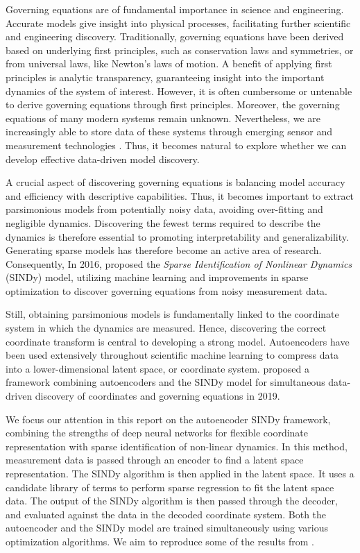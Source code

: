 Governing equations are of fundamental importance in science and engineering. 
Accurate models give insight into physical processes, facilitating further scientific and engineering discovery. 
Traditionally, governing equations have been derived based on underlying first principles, such as conservation laws and symmetries, or from universal laws, like Newton's laws of motion. 
A benefit of applying first principles is analytic transparency, guaranteeing insight into the important dynamics of the system of interest. 
However, it is often cumbersome or untenable to derive governing equations through first principles. 
Moreover, the governing equations of many modern systems remain unknown. 
Nevertheless, we are increasingly able to store data of these systems through emerging sensor and measurement technologies \cite{Champion_2019}. 
Thus, it becomes natural to explore whether we can develop effective data-driven model discovery. 

A crucial aspect of discovering governing equations is balancing model accuracy and efficiency with descriptive capabilities. 
Thus, it becomes important to extract parsimonious models from potentially noisy data, avoiding over-fitting and negligible dynamics. 
Discovering the fewest terms required to describe the dynamics is therefore essential to promoting interpretability and generalizability. 
Generating sparse models has therefore become an active area of research. 
Consequently, In 2016, \textcite{Brunton_2016} proposed the \textit{Sparse Identification of Nonlinear Dynamics} (SINDy) model, utilizing machine learning and improvements in sparse optimization to discover governing equations from noisy measurement data. 

Still, obtaining parsimonious models is fundamentally linked to the coordinate system in which the dynamics are measured. 
Hence, discovering the correct coordinate transform is central to developing a strong model. 
Autoencoders have been used extensively throughout scientific machine learning to compress data into a lower-dimensional latent space, or coordinate system. \textcite{Champion_2019} proposed a framework combining autoencoders and the SINDy model for simultaneous data-driven discovery of coordinates and governing equations in 2019.

We focus our attention in this report on the autoencoder SINDy framework, combining the strengths of deep neural networks for flexible coordinate representation with sparse identification of non-linear dynamics. 
In this method, measurement data is passed through an encoder to find a latent space representation. 
The SINDy algorithm is then applied in the latent space. 
It uses a candidate library of terms to perform sparse regression to fit the latent space data. 
The output of the SINDy algorithm is then passed through the decoder, and evaluated against the data in the decoded coordinate system. 
Both the autoencoder and the SINDy model are trained simultaneously using various optimization algorithms. 
We aim to reproduce some of the results from \textcite{Champion_2019}.%

